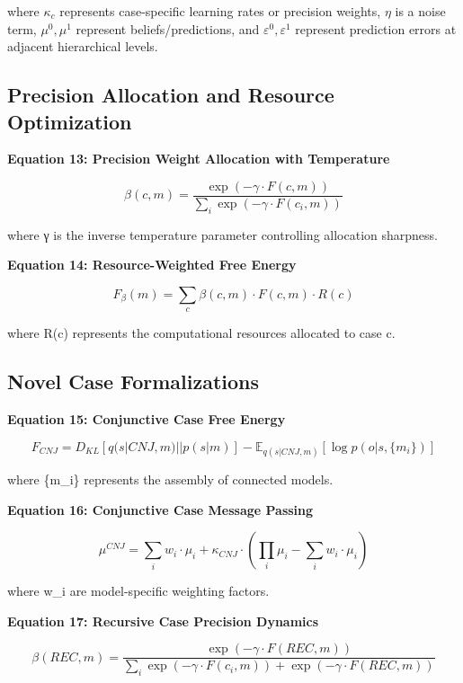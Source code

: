 where \(\kappa_c\) represents case-specific learning rates or precision
weights, \(\eta\) is a noise term, \(\mu^0, \mu^1\) represent
beliefs/predictions, and \(\varepsilon^0, \varepsilon^1\) represent
prediction errors at adjacent hierarchical levels.

\hypertarget{precision-allocation-and-resource-optimization}{%
\subsection{Precision Allocation and Resource
Optimization}\label{precision-allocation-and-resource-optimization}}

\textbf{Equation 13: Precision Weight Allocation with Temperature}

\[\beta(c,m) = \frac{\exp(-\gamma \cdot F(c,m))}{\sum_i \exp(-\gamma \cdot F(c_i,m))}  \tag{13}\]

where γ is the inverse temperature parameter controlling allocation
sharpness.

\textbf{Equation 14: Resource-Weighted Free Energy}

\[F_{\beta}(m) = \sum_c \beta(c,m) \cdot F(c,m) \cdot R(c)  \tag{14}\]

where R(c) represents the computational resources allocated to case c.

\hypertarget{novel-case-formalizations}{%
\subsection{Novel Case Formalizations}\label{novel-case-formalizations}}

\textbf{Equation 15: Conjunctive Case Free Energy}

\[
F_{CNJ} = D_{KL}[q(s|CNJ,m) || p(s|m)] - \mathbb{E}_{q(s|CNJ,m)}[\log p(o|s,\{m_i\})]  \tag{15}
\]

where \{m\_i\} represents the assembly of connected models.

\textbf{Equation 16: Conjunctive Case Message Passing}

\[\mu^{CNJ} = \sum_i w_i \cdot \mu_i + \kappa_{CNJ} \cdot (\prod_i \mu_i - \sum_i w_i \cdot \mu_i)  \tag{16}\]

where w\_i are model-specific weighting factors.

\textbf{Equation 17: Recursive Case Precision Dynamics}

\[\beta(REC,m) = \frac{\exp(-\gamma \cdot F(REC,m))}{\sum_i \exp(-\gamma \cdot F(c_i,m)) + \exp(-\gamma \cdot F(REC,m))}  \tag{17}\]

